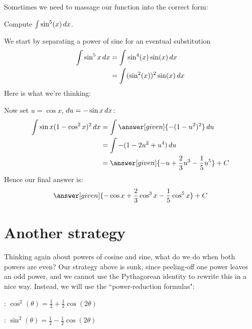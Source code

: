 \documentclass{ximera}
\begin{document}
Sometimes we need to massage our function into the correct form:

\begin{example}
  Compute $\int \sin^5(x) \mathop{}\!d x$.
  
  \begin{explanation}
    We start by separating a power of sine for an eventual substitution
    \begin{align*}
      \int \sin^5 x\mathop{}\!d x &=\int \sin^4(x) \sin(x) \mathop{}\!d x\\
      &=\int (\sin^2(x))^2 \sin(x) \mathop{}\!d x
    \end{align*}
    Here is what we're thinking:
    \begin{center}%
    \end{center}
    Now set $u=\cos x$, $\mathop{}\!d u=-\sin x\mathop{}\!d x$:
    \begin{align*}
      \int \sin x (1-\cos^2 x)^2\d x&=\int \answer[given]{-(1-u^2)^2} \d u \\
      &=\int -(1-2u^2+u^4)\d u \\
      &=\answer[given]{-u+\frac{2}{3}u^3-\frac{1}{5}u^5}+C
    \end{align*}
    Hence our final answer is:
    \[
    \answer[given]{-\cos x+\frac{2}{3}\cos^3 x-\frac{1}{5}\cos^5x}+C
    \]
  \end{explanation}
\end{example}

\section{Another strategy}

Thinking again about powers of cosine and sine, what do we do when both powers are even?  Our strategy above is sunk, since peeling-off one power leaves an odd power, and we cannot use the Pythagorean identity to rewrite this in a nice way.  Instead, we will use the ``power-reduction formulas":

\begin{description}
\item[Cosine Power-Reduction]: $\cos^2(\theta)= \frac{1}{2}+\frac{1}{2}\cos(2\theta)$ 
\item[Sine Power-Reduction]: $\sin^2(\theta) = \frac{1}{2}-\frac{1}{2}\cos(2\theta)$
\end{description}
\end{document}
